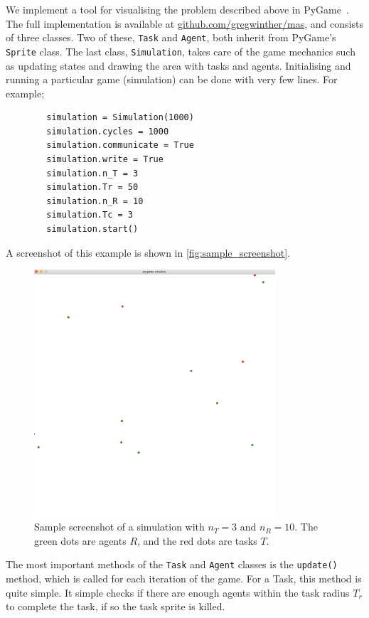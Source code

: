 \documentclass[11pt]{article}
\begin{document}
    We implement a tool for visualising the problem described above in 
    PyGame~\cite{pygame}.
    The full implementation is available at \url{github.com/gregwinther/mas},
    and consists of three classes. Two of these, \lstinline!Task! and \lstinline!Agent!,
    both inherit from PyGame's \lstinline!Sprite! class. The last class,
    \lstinline!Simulation!, takes care of the game mechanics such as updating
    states and drawing the area with tasks and agents. Initialising and running 
    a particular game (simulation) can be done with very few lines. For example;
    \begin{lstlisting}
        simulation = Simulation(1000)
        simulation.cycles = 1000
        simulation.communicate = True
        simulation.write = True
        simulation.n_T = 3
        simulation.Tr = 50
        simulation.n_R = 10
        simulation.Tc = 3
        simulation.start()
    \end{lstlisting}
    A screenshot of this example is shown in \autoref{fig:sample_screenshot}.

    \begin{figure}
        \centering
        \includegraphics[width=0.8\textwidth]{figures/screenshot.png}
        \caption{
            Sample screenshot of a simulation with $n_T=3$ and $n_R=10$.
            The green dots are agents $R$, and the red 
            dots are tasks $T$. 
        }
        \label{fig:sample_screenshot}
    \end{figure}

    The most important methods of the \lstinline!Task! and \lstinline!Agent!
    classes is the \lstinline!update()! method, which is called for 
    each iteration of the game. For a Task, this method is 
    quite simple. It simple checks if there are enough agents within the 
    task radius $T_r$ to complete the task, if so the task sprite is killed.
    
\end{document}
